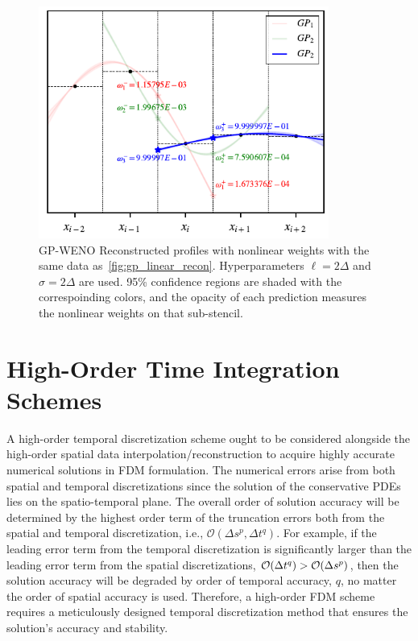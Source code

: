 \begin{figure}
    \centering
    \includegraphics[width=0.85\textwidth]{fig/gp_weno_nonlinW}
    \caption{GP-WENO Reconstructed profiles with nonlinear weights with the same data as~\cref{fig:gp_linear_recon}.
        Hyperparameters \( \ell = 2\Delta \) and \( \sigma = 2\Delta \) are used. 95\% confidence regions
        are shaded with the correspoinding colors, and the opacity of each prediction measures the nonlinear weights
        on that sub-stencil.
    }\label{fig:gp_weno_nonlinW}
\end{figure}




\section{High-Order Time Integration Schemes}\label{sec:time_integration}

A high-order temporal discretization scheme ought to be considered alongside
the high-order spatial data interpolation/reconstruction to acquire
highly accurate numerical solutions in FDM formulation.
The numerical errors arise from both spatial and temporal discretizations
since the solution of the conservative PDEs lies on the spatio-temporal plane.
The overall order of solution accuracy will be determined by the highest order term
of the truncation errors both from the spatial and temporal discretization, i.e.,
\( \mathcal{O}(\Delta s^{p}, \Delta t^{q}) \).
For example, if the leading error term from the temporal discretization
is significantly larger than the leading error term from the spatial discretizations,
\( \mathcal{O}(\Delta t^{q}) > \mathcal{O}(\Delta s^{p}) \),
then the solution accuracy will be degraded by order of temporal accuracy, \( q \),
no matter the order of spatial accuracy is used.
Therefore, a high-order FDM scheme requires a meticulously designed
temporal discretization method that ensures the solution’s accuracy and stability.

